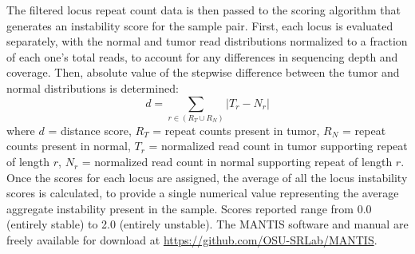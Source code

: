 The filtered locus repeat count data is then passed to the scoring algorithm that generates an instability score for the sample pair. First, each locus is evaluated separately, with the normal and tumor read distributions normalized to a fraction of each one's total reads, to account for any differences in sequencing depth and coverage. Then, absolute value of the stepwise difference between the tumor and normal distributions is determined:
\begin{equation}
	d=\sum_{r \in (R_T \cup R_N)} \left|T_r - N_r\right|
	\label{eqn:msilandscape:mantis_sum}
\end{equation}
where $d$ = distance score, $R_T$ = repeat counts present in tumor, $R_N$ = repeat counts present in normal, $T_r$ = normalized read count in tumor supporting repeat of length $r$, $N_r$ = normalized read count in normal supporting repeat of length $r$. Once the scores for each locus are assigned, the average of all the locus instability scores is calculated, to provide a single numerical value representing the average aggregate instability present in the sample. Scores reported range from 0.0 (entirely stable) to 2.0 (entirely unstable). The MANTIS software and manual are freely available for download at \url{https://github.com/OSU-SRLab/MANTIS}.

